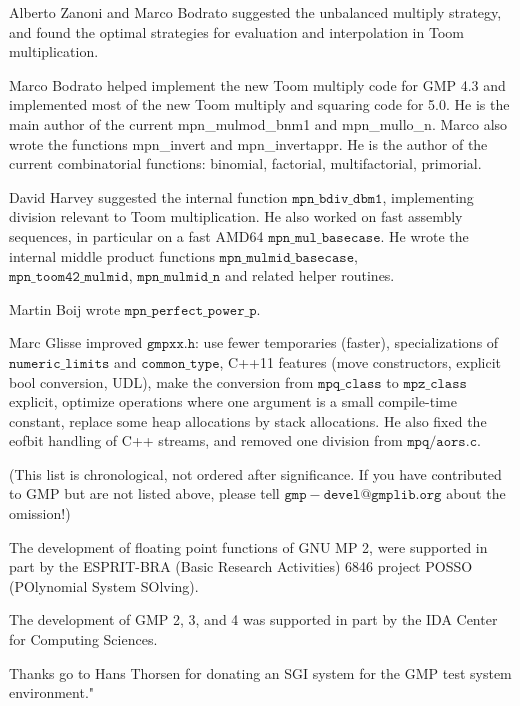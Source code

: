 \vpara
Alberto Zanoni and Marco Bodrato suggested the unbalanced multiply strategy,
and found the optimal strategies for evaluation and interpolation in Toom
multiplication.

\vpara
Marco Bodrato helped implement the new Toom multiply code for GMP 4.3 and
implemented most of the new Toom multiply and squaring code for 5.0.
He is the main author of the current mpn\_mulmod\_bnm1 and mpn\_mullo\_n.  Marco
also wrote the functions mpn\_invert and mpn\_invertappr.  He is the author of
the current combinatorial functions: binomial, factorial, multifactorial,
primorial.

\vpara
David Harvey suggested the internal function $\mathtt{mpn\_bdiv\_dbm1}$, implementing
division relevant to Toom multiplication.  He also worked on fast assembly
sequences, in particular on a fast AMD64 $\mathtt{mpn\_mul\_basecase}$. He wrote
the internal middle product functions $\mathtt{mpn\_mulmid\_basecase}$, \\
$\mathtt{mpn\_toom42\_mulmid}$, $\mathtt{mpn\_mulmid\_n}$ and related helper routines.

\vpara
Martin Boij wrote $\mathtt{mpn\_perfect\_power\_p}$.

\vpara
Marc Glisse improved $\mathtt{gmpxx.h}$: use fewer temporaries (faster),
specializations of $\mathtt{numeric\_limits}$ and $\mathtt{common\_type}$, C++11
features (move constructors, explicit bool conversion, UDL), make the
conversion from $\mathtt{mpq\_class}$ to $\mathtt{mpz\_class}$ explicit, optimize
operations where one argument is a small compile-time constant, replace
some heap allocations by stack allocations.  He also fixed the eofbit
handling of C++ streams, and removed one division from $\mathtt{mpq/aors.c}$.

\vpara
(This list is chronological, not ordered after significance.  If you have
contributed to GMP but are not listed above, please tell
$\mathtt{gmp-devel@gmplib.org}$ about the omission!)

\vpara
The development of floating point functions of GNU MP 2, were supported in part
by the ESPRIT-BRA (Basic Research Activities) 6846 project POSSO (POlynomial
System SOlving).

\vpara
The development of GMP 2, 3, and 4 was supported in part by the IDA Center for
Computing Sciences.

\vpara
Thanks go to Hans Thorsen for donating an SGI system for the GMP test system
environment."





